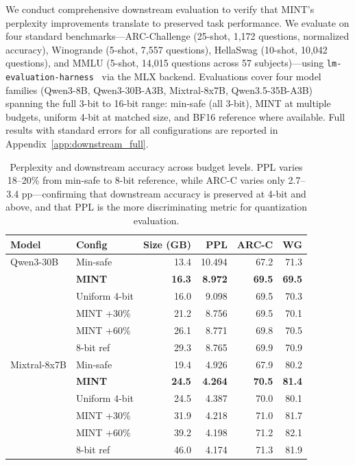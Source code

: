 \documentclass{article}
\begin{document}
We conduct comprehensive downstream evaluation to verify that MINT's perplexity improvements translate to preserved task performance. We evaluate on four standard benchmarks---ARC-Challenge (25-shot, 1{,}172 questions, normalized accuracy), Winogrande (5-shot, 7{,}557 questions), HellaSwag (10-shot, 10{,}042 questions), and MMLU (5-shot, 14{,}015 questions across 57 subjects)---using \texttt{lm-evaluation-harness}~\cite{eval-harness} via the MLX backend. Evaluations cover four model families (Qwen3-8B, Qwen3-30B-A3B, Mixtral-8x7B, Qwen3.5-35B-A3B) spanning the full 3-bit to 16-bit range: min-safe (all 3-bit), MINT at multiple budgets, uniform 4-bit at matched size, and BF16 reference where available. Full results with standard errors for all configurations are reported in Appendix~\ref{app:downstream_full}.

\begin{table}[h]
\centering
\caption{Perplexity and downstream accuracy across budget levels. PPL varies 18--20\% from min-safe to 8-bit reference, while ARC-C varies only 2.7--3.4 pp---confirming that downstream accuracy is preserved at 4-bit and above, and that PPL is the more discriminating metric for quantization evaluation.}
\label{tab:benchmarks}
\begin{tabular}{llrrrr}
\toprule
Model & Config & Size (GB) & PPL & ARC-C & WG \\
\midrule
Qwen3-30B & Min-safe & 13.4 & 10.494 & 67.2 & 71.3 \\
 & \textbf{MINT} & \textbf{16.3} & \textbf{8.972} & \textbf{69.5} & \textbf{69.5} \\
 & Uniform 4-bit & 16.0 & 9.098 & 69.5 & 70.3 \\
 & MINT +30\% & 21.2 & 8.756 & 69.5 & 70.1 \\
 & MINT +60\% & 26.1 & 8.771 & 69.8 & 70.5 \\
 & 8-bit ref & 29.3 & 8.765 & 69.9 & 70.9 \\
\midrule
Mixtral-8x7B & Min-safe & 19.4 & 4.926 & 67.9 & 80.2 \\
 & \textbf{MINT} & \textbf{24.5} & \textbf{4.264} & \textbf{70.5} & \textbf{81.4} \\
 & Uniform 4-bit & 24.5 & 4.387 & 70.0 & 80.1 \\
 & MINT +30\% & 31.9 & 4.218 & 71.0 & 81.7 \\
 & MINT +60\% & 39.2 & 4.198 & 71.2 & 82.1 \\
 & 8-bit ref & 46.0 & 4.174 & 71.3 & 81.9 \\
\bottomrule
\end{tabular}
\end{table}
\end{document}

